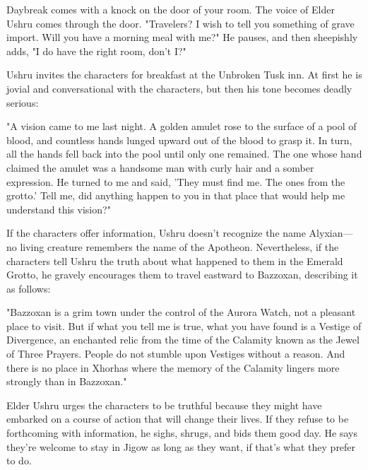 \documentclass[10pt,a4paper,twoside,bg=print,twocolumn,openany,nodeprecatedcode]{dndbook}
\begin{document}
\begin{DndReadAloud}{}
Daybreak comes with a knock on the door of your room. The voice of Elder Ushru comes through the door. "Travelers? I wish to tell you something of grave import. Will you have a morning meal with me?" He pauses, and then sheepishly adds, "I do have the right room, don't I?"

\end{DndReadAloud}

Ushru invites the characters for breakfast at the Unbroken Tusk inn. At first he is jovial and conversational with the characters, but then his tone becomes deadly serious:

\begin{DndReadAloud}{}
"A vision came to me last night. A golden amulet rose to the surface of a pool of blood, and countless hands lunged upward out of the blood to grasp it. In turn, all the hands fell back into the pool until only one remained. The one whose hand claimed the amulet was a handsome man with curly hair and a somber expression. He turned to me and said, 'They must find me. The ones from the grotto.' Tell me, did anything happen to you in that place that would help me understand this vision?"

\end{DndReadAloud}

If the characters offer information, Ushru doesn't recognize the name Alyxian—no living creature remembers the name of the Apotheon. Nevertheless, if the characters tell Ushru the truth about what happened to them in the Emerald Grotto, he gravely encourages them to travel eastward to Bazzoxan, describing it as follows:

\begin{DndReadAloud}{}
"Bazzoxan is a grim town under the control of the Aurora Watch, not a pleasant place to visit. But if what you tell me is true, what you have found is a Vestige of Divergence, an enchanted relic from the time of the Calamity known as the Jewel of Three Prayers. People do not stumble upon Vestiges without a reason. And there is no place in Xhorhas where the memory of the Calamity lingers more strongly than in Bazzoxan."

\end{DndReadAloud}

Elder Ushru urges the characters to be truthful because they might have embarked on a course of action that will change their lives. If they refuse to be forthcoming with information, he sighs, shrugs, and bids them good day. He says they're welcome to stay in Jigow as long as they want, if that's what they prefer to do.
\end{document}
